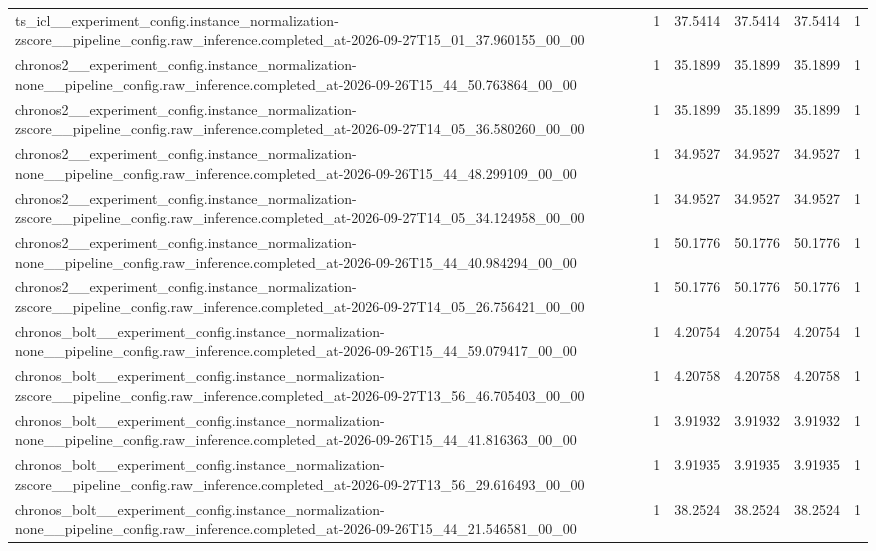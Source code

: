 \begin{tabular}{llllll}
ts\_icl\_\_experiment\_config.instance\_normalization-zscore\_\_pipeline\_config.raw\_inference.completed\_at-2026-09-27T15\_01\_37.960155\_00\_00 & 1 & 37.5414 & 37.5414 & 37.5414 & 1 \\
chronos2\_\_experiment\_config.instance\_normalization-none\_\_pipeline\_config.raw\_inference.completed\_at-2026-09-26T15\_44\_50.763864\_00\_00 & 1 & 35.1899 & 35.1899 & 35.1899 & 1 \\
chronos2\_\_experiment\_config.instance\_normalization-zscore\_\_pipeline\_config.raw\_inference.completed\_at-2026-09-27T14\_05\_36.580260\_00\_00 & 1 & 35.1899 & 35.1899 & 35.1899 & 1 \\
chronos2\_\_experiment\_config.instance\_normalization-none\_\_pipeline\_config.raw\_inference.completed\_at-2026-09-26T15\_44\_48.299109\_00\_00 & 1 & 34.9527 & 34.9527 & 34.9527 & 1 \\
chronos2\_\_experiment\_config.instance\_normalization-zscore\_\_pipeline\_config.raw\_inference.completed\_at-2026-09-27T14\_05\_34.124958\_00\_00 & 1 & 34.9527 & 34.9527 & 34.9527 & 1 \\
chronos2\_\_experiment\_config.instance\_normalization-none\_\_pipeline\_config.raw\_inference.completed\_at-2026-09-26T15\_44\_40.984294\_00\_00 & 1 & 50.1776 & 50.1776 & 50.1776 & 1 \\
chronos2\_\_experiment\_config.instance\_normalization-zscore\_\_pipeline\_config.raw\_inference.completed\_at-2026-09-27T14\_05\_26.756421\_00\_00 & 1 & 50.1776 & 50.1776 & 50.1776 & 1 \\
chronos\_bolt\_\_experiment\_config.instance\_normalization-none\_\_pipeline\_config.raw\_inference.completed\_at-2026-09-26T15\_44\_59.079417\_00\_00 & 1 & 4.20754 & 4.20754 & 4.20754 & 1 \\
chronos\_bolt\_\_experiment\_config.instance\_normalization-zscore\_\_pipeline\_config.raw\_inference.completed\_at-2026-09-27T13\_56\_46.705403\_00\_00 & 1 & 4.20758 & 4.20758 & 4.20758 & 1 \\
chronos\_bolt\_\_experiment\_config.instance\_normalization-none\_\_pipeline\_config.raw\_inference.completed\_at-2026-09-26T15\_44\_41.816363\_00\_00 & 1 & 3.91932 & 3.91932 & 3.91932 & 1 \\
chronos\_bolt\_\_experiment\_config.instance\_normalization-zscore\_\_pipeline\_config.raw\_inference.completed\_at-2026-09-27T13\_56\_29.616493\_00\_00 & 1 & 3.91935 & 3.91935 & 3.91935 & 1 \\
chronos\_bolt\_\_experiment\_config.instance\_normalization-none\_\_pipeline\_config.raw\_inference.completed\_at-2026-09-26T15\_44\_21.546581\_00\_00 & 1 & 38.2524 & 38.2524 & 38.2524 & 1 \\

\end{tabular}

